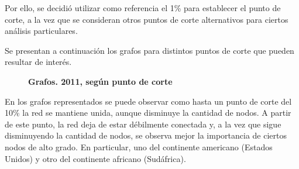 \documentclass[runningheads,a4paper]{llncs}
\begin{document}
Por ello, se decidió utilizar como referencia el 1\% para establecer el punto de corte, a la vez que se consideran otros puntos de corte alternativos para ciertos análisis particulares.

Se presentan a continuación los grafos para distintos puntos de corte que pueden resultar de interés.


\begin{figure}
\centering
{}
\caption{\textbf{Grafos. 2011, según punto de corte}}
\label{fig:grafo_2011}
\end{figure}


En los grafos representados se puede observar como hasta un punto de corte del 10\% la red se mantiene unida, aunque disminuye la cantidad de nodos. A partir de este punto, la red deja de estar débilmente conectada y, a la vez que sigue disminuyendo la cantidad de nodos, se observa mejor la importancia de ciertos nodos de alto grado. En particular, uno del continente americano (Estados Unidos) y otro del continente africano (Sudáfrica).
\end{document}
